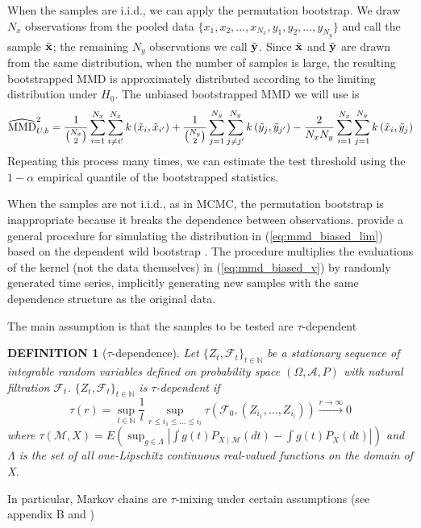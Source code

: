 \documentclass[a4paper,11pt]{article}
\newtheorem{definition}[theorem]{DEFINITION}
\begin{document}
When the samples are i.i.d., we can apply the permutation bootstrap. We draw $N_{x}$ observations from the pooled data $\{x_{1}, x_{2}, \ldots, x_{N_{x}}, y_{1}, y_{2}, \ldots, y_{N_{y}} \}$ and call the sample $\Tilde{\mathbf{x}}$; the remaining $N_{y}$ observations we call $\Tilde{\mathbf{y}}$. Since $\Tilde{\mathbf{x}}$ and $\Tilde{\mathbf{y}}$ are drawn from the same distribution, when the number of samples is large, the resulting bootstrapped MMD is approximately distributed according to the limiting distribution under $H_{0}$. The unbiased bootstrapped MMD we will use is
\begin{equation}
    \widehat{\mathrm{MMD}}_{U, b}^{2} = \frac{1}{{N_{x}\choose 2}} \sum_{i = 1}^{N_{x}} \sum_{i \neq i'}^{N_{x}} k\left(\Tilde{x}_{i}, \Tilde{x}_{i'}\right)+\frac{1}{{N_{y}\choose 2}} \sum_{j = 1}^{N_{y}} \sum_{j \neq j'}^{N_{y}} k\left(\Tilde{y}_{j}, \Tilde{y}_{j'}\right)-\frac{2}{N_{x}N_{y}} \sum_{i = 1}^{N_{x}} \sum_{j = 1}^{N_{y}} k\left(\Tilde{x}_{i}, \Tilde{y}_{j}\right)
    \label{eq:mmd_unbiased_permute}
\end{equation}
Repeating this process many times, we can estimate the test threshold using the $1-\alpha$ empirical quantile of the bootstrapped statistics.

When the samples are not i.i.d., as in MCMC, the permutation bootstrap is inappropriate because it breaks the dependence between observations. \cite{chwialkowski_wild_2016} provide a general procedure for simulating the distribution in (\ref{eq:mmd_biased_lim}) based on the dependent wild bootstrap \cite{shao_dependent_2010}. The procedure multiplies the evaluations of the kernel (not the data themselves) in (\ref{eq:mmd_biased_v}) by randomly generated time series, implicitly generating new samples with the same dependence structure as the original data.

The main assumption is that the samples to be tested are $\tau$-dependent
\begin{definition}[$\tau$-dependence]
Let $\{Z_{t}, \mathcal{F}_{t}\}_{t \in \mathbb{N}}$ be a stationary sequence of integrable random variables defined on probability space $(\Omega, \mathcal{A}, P)$ with natural filtration $\mathcal{F}_{t}$. $\{Z_{t}, \mathcal{F}_{t}\}_{t \in \mathbb{N}}$ is $\tau$-dependent if
\begin{equation}
    \tau(r)=\sup _{l \in \mathbb{N}} \frac{1}{l} \sup _{r \leq i_{1} \leq \ldots \leq i_{l}} \tau\left(\mathcal{F}_{0},\left(Z_{i_{1}}, \ldots, Z_{i_{l}}\right)\right) \stackrel{r \rightarrow \infty}{\longrightarrow} 0
\end{equation}
where $\tau(\mathcal{M}, X)=E\left(\sup _{g \in \Lambda}\left|\int g(t) P_{X \mid \mathcal{M}}(d t)-\int g(t) P_{X}(d t)\right|\right)$ and $\Lambda$ is the set of all one-Lipschitz continuous real-valued functions on the domain of X.
\end{definition}
In particular, Markov chains are $\tau$-mixing under certain assumptions (see \cite{chwialkowski_wild_2016} appendix B and \cite{dedecker_new_2005})
\end{document}
